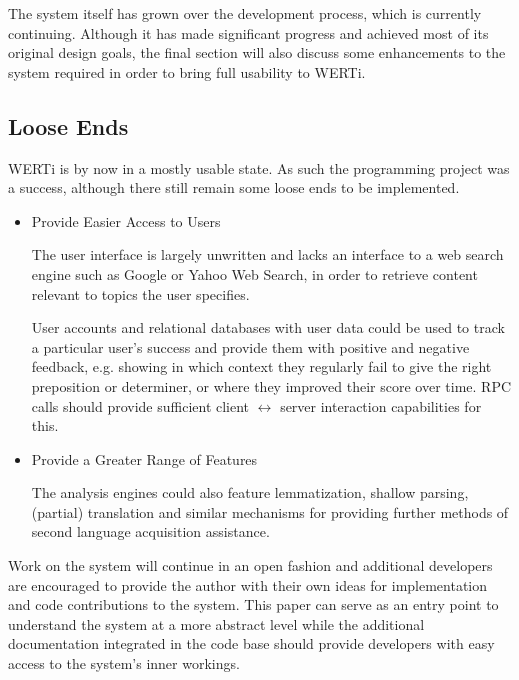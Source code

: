 \documentclass[12pt]{scrartcl}
\begin{document}
The system itself has grown over the development process, 
which is currently continuing. Although it has made significant progress
and achieved most of its original design goals, the final section will also discuss
some enhancements to the system required in order to bring full usability to
WERTi.

\subsection{Loose Ends}

WERTi is by now in a mostly usable state. As such the programming project was a
success, although there still remain some loose ends to be implemented. \begin{itemize}
\item{Provide Easier Access to Users}

The user interface is largely unwritten and lacks an interface to a web search
engine such as Google or Yahoo Web Search, in order to retrieve content relevant
to topics the user specifies.

User accounts and relational databases with user data could be used to track a
particular user's success and provide them with positive and negative feedback, e.g.
showing in which context they regularly fail to give the right preposition or
determiner, or where they improved their score over time. RPC calls should
provide sufficient client $\leftrightarrow$ server interaction capabilities for
this.

\item{Provide a Greater Range of Features}

The analysis engines could also feature lemmatization, shallow parsing,
(partial) translation and similar mechanisms for providing further methods of
second language acquisition assistance. %
\end{itemize}

Work on the system will continue in an open fashion and additional developers
are encouraged to provide the author with their own ideas for implementation and
code contributions to the system. This paper can serve as an entry point to
understand the system at a more abstract level while the additional
documentation integrated in the code base should provide developers with easy
access to the system's inner workings.


\end{document}
